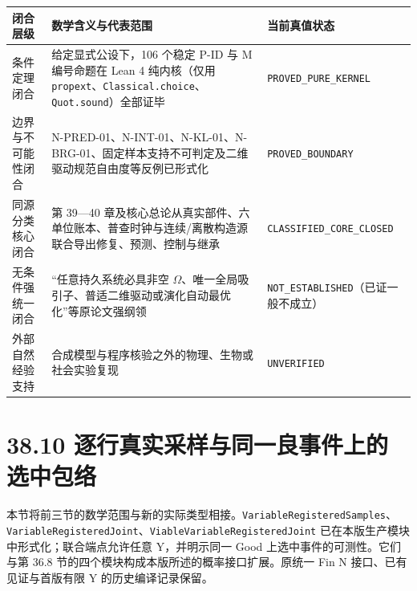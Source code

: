\documentclass[
  11pt,
  oneside]{book}
\newcounter{none} %
\begin{document}
{\def\LTcaptype{none} %
\begin{longtable}[]{@{}
  >{\raggedright\arraybackslash}p{}
  >{\raggedright\arraybackslash}p{}
  >{\raggedright\arraybackslash}p{}@{}}
\toprule\noalign{}
\begin{minipage}[b]{\linewidth}\raggedright
闭合层级
\end{minipage} & \begin{minipage}[b]{\linewidth}\raggedright
数学含义与代表范围
\end{minipage} & \begin{minipage}[b]{\linewidth}\raggedright
当前真值状态
\end{minipage} \\
\midrule\noalign{}
\endhead
\bottomrule\noalign{}
\endlastfoot
条件定理闭合 & 给定显式公设下，106 个稳定 P-ID 与 M 编号命题在 Lean 4 纯内核（仅用 \texttt{propext}、\nolinkurl{Classical.choice}、\texttt{Quot.sound}）全部证毕 & \nolinkurl{PROVED_PURE_KERNEL} \\
边界与不可能性闭合 & N-PRED-01、N-INT-01、N-KL-01、N-BRG-01、固定样本支持不可判定及二维驱动规范自由度等反例已形式化 & \nolinkurl{PROVED_BOUNDARY} \\
同源分类核心闭合 & 第 39---40 章及核心总论从真实部件、六单位账本、普查时钟与连续/离散构造源联合导出修复、预测、控制与继承 & \nolinkurl{CLASSIFIED_CORE_CLOSED} \\
无条件强统一闭合 & ``任意持久系统必具非空 \(\Omega\)、唯一全局吸引子、普适二维驱动或演化自动最优化''等原论文强纲领 & \nolinkurl{NOT_ESTABLISHED}（已证一般不成立） \\
外部自然经验支持 & 合成模型与程序核验之外的物理、生物或社会实验复现 & \texttt{UNVERIFIED} \\
\end{longtable}
}

\section{38.10 逐行真实采样与同一良事件上的选中包络}\label{ux9010ux884cux771fux5b9eux91c7ux6837ux4e0eux540cux4e00ux826fux4e8bux4ef6ux4e0aux7684ux9009ux4e2dux5305ux7edc}

本节将前三节的数学范围与新的实际类型相接。\nolinkurl{VariableRegisteredSamples}、\nolinkurl{VariableRegisteredJoint}、\nolinkurl{ViableVariableRegisteredJoint} 已在本版生产模块中形式化；联合端点允许任意 Y，并明示同一 Good 上选中事件的可测性。它们与第 36.8 节的四个模块构成本版所述的概率接口扩展。原统一 Fin N 接口、已有见证与首版有限 Y 的历史编译记录保留。
\end{document}
